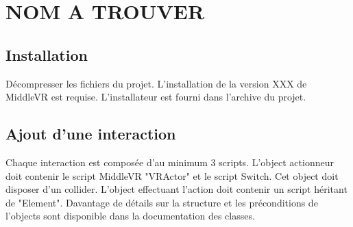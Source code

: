 \section{NOM A TROUVER}

\subsection{Installation}
	Décompresser les fichiers du projet.
	L'installation de la version XXX de MiddleVR est requise. L'installateur est fourni dans l'archive du projet.
	
\subsection{Ajout d'une interaction}
	Chaque interaction est composée d'au minimum 3 scripts.
	L'object actionneur doit contenir le script MiddleVR "VRActor" et le script Switch.
	Cet object doit disposer d'un collider.
	L'object effectuant l'action doit contenir un script héritant de "Element". Davantage de détails sur la structure et les préconditions de l'objects sont disponible dans la documentation des classes.
